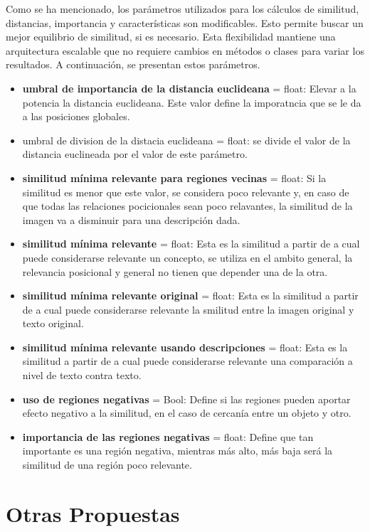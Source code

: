 Como se ha mencionado, los parámetros utilizados para los cálculos de similitud, distancias, importancia y características son modificables. Esto permite buscar un mejor equilibrio de similitud, si es necesario. Esta flexibilidad mantiene una arquitectura escalable que no requiere cambios en métodos o clases para variar los resultados. A continuación, se presentan estos parámetros.
\begin{itemize}
    \item \textbf{umbral de importancia de la distancia euclideana} = float: Elevar a la potencia la distancia euclideana. Este valor define la imporatncia que se le da a las posiciones globales.
    \item umbral de division de la distacia euclideana = float: se divide el valor de la distancia euclineada por el valor de este par\'ametro.
    \item \textbf{similitud m\'inima relevante para regiones vecinas} = float: Si la similitud es menor que este valor, se considera poco relevante y, en caso de que todas las relaciones pocicionales sean poco relavantes, la similitud de la imagen va a disminuir para una descripci\'on dada.
    \item \textbf{similitud m\'inima relevante} = float: Esta es la similitud a partir de a cual puede considerarse relevante un concepto, se utiliza en el ambito general, la relevancia posicional y general no tienen que depender una de la otra.
    \item \textbf{similitud m\'inima relevante original} = float: Esta es la similitud a partir de a cual puede considerarse relevante la smilitud entre la imagen original y texto original.
    \item \textbf{similitud m\'inima relevante usando descripciones} = float: Esta es la similitud a partir de a cual puede considerarse relevante una comparación a nivel de texto contra texto. 
    \item \textbf{uso de regiones negativas} = Bool: Define si las regiones pueden aportar efecto negativo a la similitud, en el caso de cercan\'ia entre un objeto y otro.
    \item \textbf{importancia de las regiones negativas} = float: Define que tan importante es una regi\'on negativa, mientras m\'as alto, m\'as baja ser\'a la similitud de una regi\'on poco relevante.
\end{itemize}

\section{Otras Propuestas}

